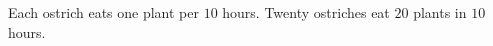 Each ostrich eats one plant per $10$ hours. Twenty ostriches eat $20$ plants in $\boxed{10}$ hours.
